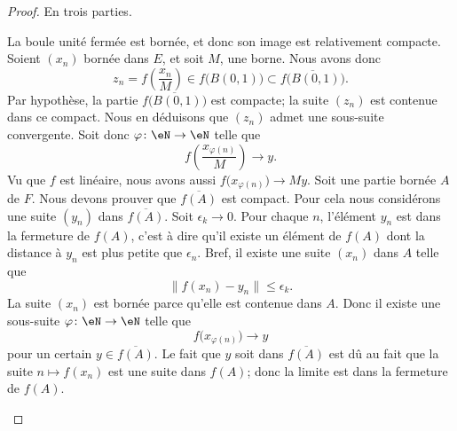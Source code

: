 \begin{proof}
	En trois parties.
	\begin{subproof}
		\spitem[\ref{ITEMooAFNXooUGbZsh} \( \Rightarrow\) \ref{ItemJIkpUbLii}]
		La boule unité fermée est bornée, et donc son image est relativement compacte.
		\spitem[\ref{ItemJIkpUbLii} \( \Rightarrow\) \ref{ITEMooQKISooBpyyee}]
		Soient \( (x_n)\) bornée dans \( E\), et soit \( M\), une borne. Nous avons donc
		\begin{equation}
			z_n=f\left( \frac{ x_n }{ M } \right)\in f\big( B(0,1) \big)\subset \overline{f\big( B(0,1) \big)}.
		\end{equation}
		Par hypothèse, la partie \( \overline{f\big( B(0,1) \big)}\) est compacte; la suite \( (z_n)\) est contenue dans ce compact. Nous en déduisons que \( (z_n)\) admet une sous-suite convergente. Soit donc \( \varphi\colon \eN\to \eN\) telle que
		\begin{equation}
			f\left( \frac{ x_{\varphi(n)} }{ M } \right)\to y.
		\end{equation}
		Vu que \( f\) est linéaire, nous avons aussi \( f\big( x_{\varphi(n)} \big)\to My\).
		\spitem[\ref{ITEMooQKISooBpyyee} \( \Rightarrow\) \ref{ITEMooAFNXooUGbZsh}]
		Soit une partie bornée \( A\) de \( F\). Nous devons prouver que \( \overline{ f(A) }\) est compact. Pour cela nous considérons une suite \( (y_n)\) dans \( \overline{ f(A) }\). Soit \( \epsilon_k\to 0\). Pour chaque \( n\), l'élément \( y_n\) est dans la fermeture de \( f(A)\), c'est à dire qu'il existe un élément de \( f(A)\) dont la distance à \( y_n\) est plus petite que \( \epsilon_n\). Bref, il existe une suite \( (x_n)\) dans \( A\) telle que
		\begin{equation}
			\| f(x_n)-y_n \|\leq \epsilon_k.
		\end{equation}
		La suite \( (x_n)\) est bornée parce qu'elle est contenue dans \( A\). Donc il existe une sous-suite \( \varphi\colon \eN\to \eN\) telle que
		\begin{equation}
			f\big( x_{\varphi(n)} \big)\to y
		\end{equation}
		pour un certain \( y\in \overline{ f(A) }\). Le fait que \( y\) soit dans \( \overline{ f(A) }\) est dû au fait que la suite \( n\mapsto f(x_n)\) est une suite dans \( f(A)\); donc la limite est dans la fermeture de \( f(A)\).


\end{subproof}
\end{proof}
